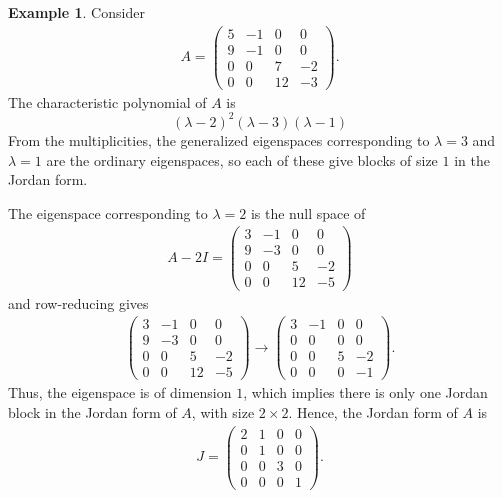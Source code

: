 \documentclass[11pt]{book}
\theoremstyle{definition}
\newtheorem{example}{Example}[section]
\numberwithin{equation}{chapter}
\begin{document}
\medskip

\begin{example}
Consider 
\begin{align*}
    A = \begin{pmatrix}
    5 & -1 & 0 & 0 \\
    9 & -1 & 0 & 0 \\
    0 & 0 & 7 & -2 \\
    0 & 0 & 12 & -3
    \end{pmatrix}.
\end{align*}
The characteristic polynomial of $A$ is 
$$(\lambda - 2)^2(\lambda - 3)(\lambda - 1)$$
From the multiplicities, the generalized eigenspaces corresponding to $\lambda = 3$ and $\lambda = 1$ are the ordinary eigenspaces, so each of these give blocks of size $1$ in the Jordan form.

The eigenspace corresponding to $\lambda = 2$ is the null space of 
\begin{align*}
    A - 2I = \begin{pmatrix}
    3 & -1 & 0 & 0 \\
    9 & -3 & 0 & 0 \\
    0 & 0 & 5 & -2 \\
    0 & 0 & 12 & -5
    \end{pmatrix}
\end{align*}
and row-reducing gives
\begin{align*}
    \begin{pmatrix}
    3 & -1 & 0 & 0 \\
    9 & -3 & 0 & 0 \\
    0 & 0 & 5 & -2 \\
    0 & 0 & 12 & -5
    \end{pmatrix} \to
    \begin{pmatrix}
    3 & -1 & 0 & 0 \\
    0 & 0 & 0 & 0 \\
    0 & 0 & 5 & -2 \\
    0 & 0 & 0 & -1
    \end{pmatrix}.
\end{align*}
Thus, the eigenspace is of dimension $1$, which implies there is only one Jordan block in the Jordan form of $A$, with size $2\times 2$. Hence, the Jordan form of $A$ is
\begin{align*}
    J = \begin{pmatrix}
    2 & 1 & 0 & 0 \\
    0 & 1 & 0 & 0 \\
    0 & 0 & 3 & 0 \\
    0 & 0 & 0 & 1
    \end{pmatrix}.
\end{align*}


\end{example}
\end{document}
